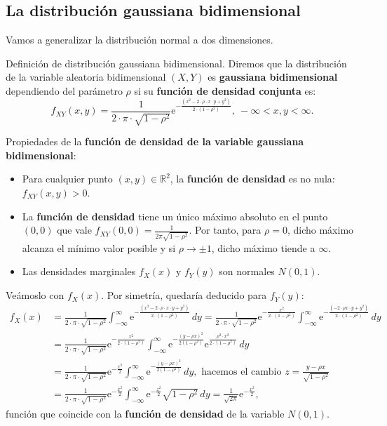 \documentclass[
  letterpaper,
  DIV=11,
  numbers=noendperiod]{scrreprt}
\begin{document}
\hypertarget{la-distribuciuxf3n-gaussiana-bidimensional}{%
\subsection{La distribución gaussiana
bidimensional}\label{la-distribuciuxf3n-gaussiana-bidimensional}}

Vamos a generalizar la distribución normal a dos dimensiones.

Definición de distribución gaussiana bidimensional. Diremos que la
distribución de la variable aleatoria bidimensional \((X,Y)\) es
\textbf{gaussiana bidimensional} dependiendo del parámetro \(\rho\) si
su \textbf{función de densidad conjunta} es: \[
f_{XY}(x,y)=\frac{1}{2\cdot\pi\cdot\sqrt{1-\rho^2}}\mathrm{e}^{-\frac{(x^2-2\cdot\rho\cdot x\cdot y+y^2)}{2\cdot(1-\rho^2)}},\ -\infty <x,y<\infty.
\]

Propiedades de la \textbf{función de densidad de la variable gaussiana
bidimensional}:

\begin{itemize}
\item
  Para cualquier punto \((x,y)\in\mathbb{R}^2\), la \textbf{función de
  densidad} es no nula: \(f_{XY}(x,y)>0\).
\item
  La \textbf{función de densidad} tiene un único máximo absoluto en el
  punto \((0,0)\) que vale
  \(f_{XY}(0,0)=\frac{1}{2\pi\sqrt{1-\rho^2}}.\) Por tanto, para
  \(\rho=0\), dicho máximo alcanza el mínimo valor posible y si
  \(\rho\to \pm 1\), dicho máximo tiende a \(\infty\).
\item
  Las densidades marginales \(f_X(x)\) y \(f_Y(y)\) son normales
  \(N(0,1)\).
\end{itemize}

Veámoslo con \(f_X(x)\). Por simetría, quedaría deducido para
\(f_Y(y)\): \[
\begin{array}{rl}
f_X(x) & =\frac{1}{2\cdot\pi\cdot\sqrt{1-\rho^2}}\int_{-\infty}^\infty \mathrm{e}^{-\frac{(x^2-2\cdot\rho \cdot x \cdot y+y^2)}{2\cdot(1-\rho^2)}}\, dy =
\frac{1}{2\cdot\pi\cdot\sqrt{1-\rho^2}}\mathrm{e}^{-\frac{x^2}{2\cdot(1-\rho^2)}}\int_{-\infty}^\infty \mathrm{e}^{-\frac{(-2\cdot\rho x\cdot y+y^2)}{2\cdot(1-\rho^2)}}\, dy \\ & = \frac{1}{2\cdot\pi\cdot\sqrt{1-\rho^2}}\mathrm{e}^{-\frac{x^2}{2\cdot(1-\rho^2)}} \int_{-\infty}^\infty \mathrm{e}^{-\frac{(y-\rho x)^2}{2(1-\rho^2)}} \mathrm{e}^{\frac{\rho^2 \cdot x^2}{2\cdot(1-\rho^2)}}\, dy \\ & =\frac{1}{2\cdot\pi\cdot\sqrt{1-\rho^2}}\mathrm{e}^{-\frac{x^2}{2}} \int_{-\infty}^\infty \mathrm{e}^{-\frac{(y-\rho x)^2}{2(1-\rho^2)}}\, dy,  \mbox{ hacemos el cambio $z=\frac{y-\rho x}{\sqrt{1-\rho^2}}$}\\ & = \frac{1}{2\cdot\pi\cdot\sqrt{1-\rho^2}}\mathrm{e}^{-\frac{x^2}{2}} \int_{-\infty}^\infty \mathrm{e}^{-\frac{z^2}{2}}\sqrt{1-\rho^2}\, dy =\frac{1}{\sqrt{2\pi}}\mathrm{e}^{-\frac{x^2}{2}},
\end{array}
\] función que coincide con la \textbf{función de densidad} de la
variable \(N(0,1)\).
\end{document}
